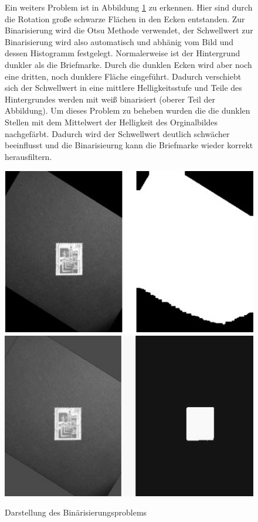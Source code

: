 \documentclass[12pt,toc=bib,toc=listof]{scrreprt}
\begin{document}
\begin{figure}[h]
\begin{minipage}[t]{.75\linewidth}

Ein weiters Problem ist in Abbildung \ref{fig:bv_prob2} zu erkennen. Hier sind durch die Rotation große schwarze Flächen in den Ecken entstanden. Zur Binarisierung wird die Otsu Methode verwendet, der Schwellwert zur Binarisierung wird also automatisch und abhänig vom Bild und dessen Histogramm festgelegt. Normalerweise ist der Hintergrund dunkler als die Briefmarke. Durch die dunklen Ecken wird aber noch eine dritten, noch dunklere Fläche eingeführt. Dadurch verschiebt sich der Schwellwert in eine mittlere Helligkeitsstufe und Teile des Hintergrundes werden mit weiß binarisiert (oberer Teil der Abbildung). Um dieses Problem zu beheben wurden die die dunklen Stellen mit dem Mittelwert der Helligkeit des Orginalbildes nachgefärbt. Dadurch wird der Schwellwert deutlich schwächer beeinflusst und die Binarisieurng kann die Briefmarke wieder korrekt herausfiltern.
\end{minipage}
\hfill
\begin{minipage}[t]{.2\linewidth}
  \strut\vspace*{-\baselineskip}\newline\includegraphics[width=\linewidth]{./bilder/prob2_bad_bin}
  \includegraphics[width=\linewidth]{./bilder/prob2_good_bin}
  \caption{Darstellung des Binärisierungsproblems}
  \label{fig:bv_prob2}
\end{minipage}
\end{figure}
\end{document}
